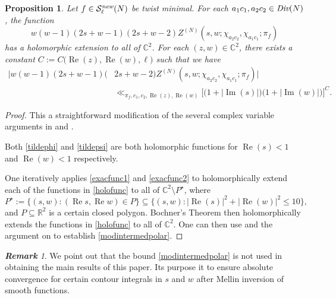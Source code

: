 \documentclass[12pt,reqno]{amsart}
\theoremstyle{plain}
\newtheorem{prop}{Proposition}
\theoremstyle{remark}
\newtheorem{remark}{\bf Remark}
\renewcommand{\Im}{\operatorname{Im}}
\renewcommand{\Re}{\operatorname{Re}}
\numberwithin{equation}{section}
\numberwithin{lemma}{section}
\numberwithin{theorem}{section}
\numberwithin{prop}{section}
\numberwithin{remark}{section}
\begin{document}
\begin{prop} \label{merocont}
Let $f \in \mathcal{S}^{\emph{new}}_{\ell}(N)$ be twist minimal.
For each $a_1 c_1, a_2 c_2 \in \emph{Div}(N)$, the function
\begin{equation} \label{holofunc}
w(w-1)(2s+w-1)(2s+w-2) Z^{(N)}(s,w;\chi_{a_2 c_2}, \chi_{a_1 c_1};\pi_f)
\end{equation}
has a holomorphic extension to all of $\mathbb{C}^2$. For each
$(z,w) \in \mathbb{C}^2$, there exists a constant 
$C:=C \big ({\Re(z),\Re(w),\ell} \big)$ such that 
we have
\begin{align} \label{modintermedpolar}
\big | w (w-1)(2s+w-1)(&2s+w-2) Z^{(N)}(s,w;\chi_{a_2 c_2}, \chi_{a_1 c_1};\pi_f) \big | \nonumber \\
& \ll_{\pi_f,c_1,c_2,\Re(z),\Re(w)} \Big[ \big(1+|\Im(s)| \big) \big(1+|\Im(w)| \big) \Big]^{C}.   
\end{align}
\end{prop}
\begin{proof}
This a straightforward modification of the 
several complex variable arguments in \cite[Lemma~2]{Blo} and 
\cite[Section~4.3]{DGH}. 

Both \eqref{tildephi} and \eqref{tildepsi} are both holomorphic functions 
for $\Re(s)<1$ and $\Re(w)<1$ respectively. 

One iteratively applies \eqref{exacfunc1} and \eqref{exacfunc2}
to holomorphically extend each of the functions 
in \eqref{holofunc} to all of $\mathbb{C}^2 \setminus P^{\star}$, 
where
\begin{equation*}
P^{\star}:=\{(s,w): (\Re s, \Re w) \in P \} \subseteq \{(s,w): |\Re(s)|^2+|\Re(w)|^2 \leq 10 \} ,
\end{equation*}
and $P \subseteq \mathbb{R}^2$ is a certain closed polygon.
Bochner's Theorem \cite{Bo} then holomorphically extends the functions in 
\eqref{holofunc} to all of $\mathbb{C}^2$. One can then use \cite[Propositions~4.6 and 4.7]{DGH}
and the argument on \cite[pg.~341]{DGH} to establish \eqref{modintermedpolar}.
\end{proof}

\begin{remark}
We point out that the bound \eqref{modintermedpolar} is not used in 
obtaining the main results of this
paper. Its purpose it to ensure absolute convergence for certain contour integrals in $s$ and $w$
after Mellin inversion of smooth functions. 
\end{remark}
\end{document}
